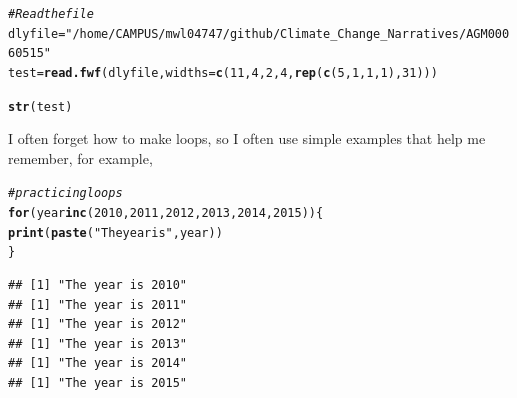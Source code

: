 \documentclass{article}\usepackage[]{graphicx}\usepackage[]{color}
\makeatletter
\newcommand{\hlnum}[1]{\textcolor[rgb]{0.686,0.059,0.569}{#1}}%
\newcommand{\hlstr}[1]{\textcolor[rgb]{0.192,0.494,0.8}{#1}}%
\newcommand{\hlcom}[1]{\textcolor[rgb]{0.678,0.584,0.686}{\textit{#1}}}%
\newcommand{\hlstd}[1]{\textcolor[rgb]{0.345,0.345,0.345}{#1}}%
\newcommand{\hlkwa}[1]{\textcolor[rgb]{0.161,0.373,0.58}{\textbf{#1}}}%
\newcommand{\hlkwb}[1]{\textcolor[rgb]{0.69,0.353,0.396}{#1}}%
\newcommand{\hlkwc}[1]{\textcolor[rgb]{0.333,0.667,0.333}{#1}}%
\newcommand{\hlkwd}[1]{\textcolor[rgb]{0.737,0.353,0.396}{\textbf{#1}}}%
\newenvironment{kframe}{%
 \def\at@end@of@kframe{}%
 \ifinner\ifhmode%
  \def\at@end@of@kframe{\end{minipage}}%
  \begin{minipage}{\columnwidth}%
 \fi\fi%
 \def\FrameCommand##1{\hskip\@totalleftmargin \hskip-\fboxsep
 \colorbox{shadecolor}{##1}\hskip-\fboxsep
     \hskip-\linewidth \hskip-\@totalleftmargin \hskip\columnwidth}%
 \MakeFramed {\advance\hsize-\width
   \@totalleftmargin\z@ \linewidth\hsize
   \@setminipage}}%
 {\par\unskip\endMakeFramed%
 \at@end@of@kframe}
\newenvironment{knitrout}{}{} %
\makeatother
\begin{document}
\begin{knitrout}
\color{fgcolor}\begin{kframe}
\begin{alltt}
\hlcom{# Read the file}
\hlstd{dlyfile} \hlkwb{=} \hlstr{"/home/CAMPUS/mwl04747/github/Climate_Change_Narratives/AGM00060515"}
\hlstd{test} \hlkwb{=} \hlkwd{read.fwf}\hlstd{(dlyfile,}\hlkwc{widths} \hlstd{=} \hlkwd{c}\hlstd{(}\hlnum{11}\hlstd{,} \hlnum{4}\hlstd{,} \hlnum{2}\hlstd{,} \hlnum{4}\hlstd{,} \hlkwd{rep}\hlstd{(}\hlkwd{c}\hlstd{(}\hlnum{5}\hlstd{,} \hlnum{1}\hlstd{,} \hlnum{1}\hlstd{,} \hlnum{1}\hlstd{),}\hlnum{31}\hlstd{)))}
\end{alltt}


{\ttfamily\noindent{}}

{\ttfamily\noindent\bfseries{}}\begin{alltt}
\hlkwd{str}\hlstd{(test)}
\end{alltt}


{\ttfamily\noindent\bfseries\color{errorcolor}{\#\# Error in str(test): object 'test' not found}}\end{kframe}
\end{knitrout}

I often forget how to make loops, so I often use simple examples that help me remember, for example, 

\begin{knitrout}
\color{fgcolor}\begin{kframe}
\begin{alltt}
\hlcom{# practicing loops}
\hlkwa{for} \hlstd{(year} \hlkwa{in} \hlkwd{c}\hlstd{(}\hlnum{2010}\hlstd{,}\hlnum{2011}\hlstd{,}\hlnum{2012}\hlstd{,}\hlnum{2013}\hlstd{,}\hlnum{2014}\hlstd{,}\hlnum{2015}\hlstd{))\{}
  \hlkwd{print}\hlstd{(}\hlkwd{paste}\hlstd{(}\hlstr{"The year is"}\hlstd{, year))}
\hlstd{\}}
\end{alltt}
\begin{verbatim}
## [1] "The year is 2010"
## [1] "The year is 2011"
## [1] "The year is 2012"
## [1] "The year is 2013"
## [1] "The year is 2014"
## [1] "The year is 2015"
\end{verbatim}
\end{kframe}
\end{knitrout}
\end{document}
